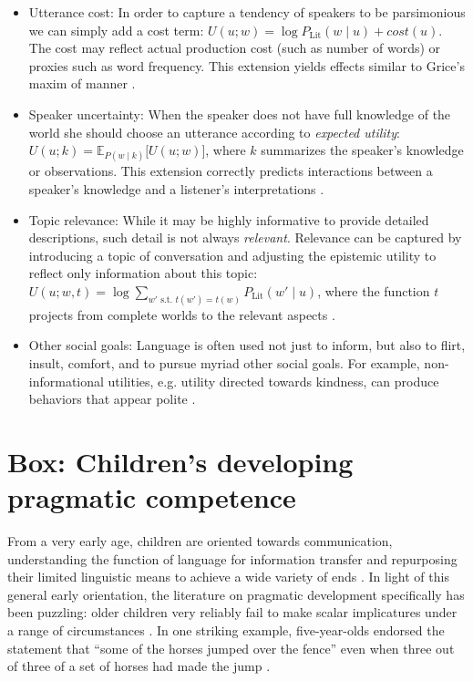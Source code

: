 \documentclass[]{elsarticle}
\begin{document}
\begin{itemize}
\item Utterance cost: In order to capture a tendency of speakers to be
  parsimonious we can simply add a cost term: $U(u; w) =
  \log P_{\text{Lit}}(w\mid u) + cost(u)$. The cost may
  reflect actual production cost (such as number of words) or proxies
  such as word frequency. This extension yields effects similar to
  Grice's maxim of manner \citep{bergen2016}.

\item Speaker uncertainty: When the speaker does not have full knowledge of
  the world she should choose an utterance according to \emph{expected
  utility}: $U(u;k) = {\mathbb E}_{P(w\mid k)}{[}U(u;w){]}$, where $k$
  summarizes the speaker's knowledge or observations. This extension
  correctly predicts interactions between a speaker's knowledge and a
  listener's interpretations \citep{goodman2013}.

\item Topic relevance: While it may be highly informative to provide detailed descriptions, such detail is not always \emph{relevant}. Relevance can be captured by introducing a topic of conversation \citep[sometimes known as a \emph{Question Under Discussion,}][]{roberts1996} and adjusting the epistemic utility to reflect only information about this topic: $U(u;w,t)=\log \sum_{w' \text{ s.t. } t(w')=t(w)} P_{\text{Lit}}(w'\mid u)$, where the function $t$ projects from complete worlds to the relevant aspects \citep{kao2014}.

\item Other social goals: Language is often used not just to inform, but
  also to flirt, insult, comfort, and to pursue myriad other social
  goals. For example, non-informational utilities, e.g. utility directed towards
  kindness, can produce behaviors that appear polite \citep{yoon2016}.

\end{itemize}

\section{Box: Children's developing pragmatic competence}\label{box-childrens-developing-pragmatic-competence}

From a very early age, children are oriented towards communication, understanding the function of language for information
transfer and repurposing their limited linguistic means to achieve a
wide variety of ends \citep{vouloumanos2012,clark2010}. In light
of this general early orientation, the literature on pragmatic
development specifically has been puzzling: older children very reliably
fail to make scalar implicatures under a range of circumstances \citep{noveck2001}. In one striking example, five-year-olds endorsed the statement that ``some of the horses jumped over the fence'' even when three out of three of a set of horses had made the jump \citep{papafragou2003}.
\end{document}
